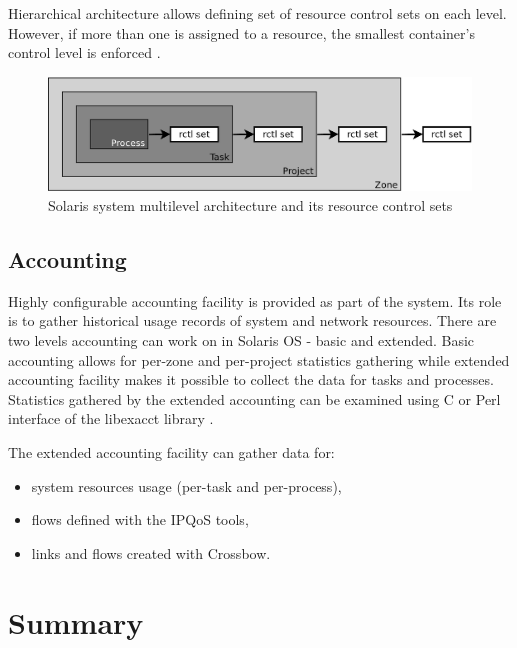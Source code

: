 \documentclass[11pt,openany]{book}
\begin{document}
      Hierarchical architecture allows defining set of resource control sets on each level. However, if more than one is
      assigned to a resource, the smallest container's control level is enforced \cite{oracle_admin_guide}. 

      \begin{figure}[H]
        \centering
        \includegraphics[width=.7\textwidth]{img/solaris/multi.pdf}

        \caption{Solaris system multilevel architecture and its resource control sets}
		  \end{figure}


      \subsection{Accounting}
      \label{sub:sol:acct}

        Highly configurable accounting facility is provided as part of the system. Its role is to gather historical
        usage records of system and network resources. There are two levels accounting can work on in Solaris
        OS - basic and extended. Basic accounting allows for per-zone and per-project statistics gathering while
        extended accounting facility makes it possible to collect the data for tasks and processes. Statistics gathered
        by the extended accounting can be examined using C or Perl interface of the libexacct library \cite{sag}.

        The extended accounting facility can gather data for:

        \begin{itemize}
          \item system resources usage (per-task and per-process),
          \item flows defined with the IPQoS tools,
          \item links and flows created with Crossbow.
        \end{itemize}



    \section*{Summary}
\end{document}
